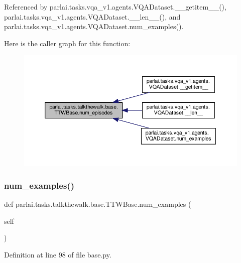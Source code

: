 Referenced by parlai.\+tasks.\+vqa\+\_\+v1.\+agents.\+V\+Q\+A\+Dataset.\+\_\+\+\_\+getitem\+\_\+\+\_\+(), parlai.\+tasks.\+vqa\+\_\+v1.\+agents.\+V\+Q\+A\+Dataset.\+\_\+\+\_\+len\+\_\+\+\_\+(), and parlai.\+tasks.\+vqa\+\_\+v1.\+agents.\+V\+Q\+A\+Dataset.\+num\+\_\+examples().

Here is the caller graph for this function\+:
\nopagebreak
\begin{figure}[H]
\begin{center}
\leavevmode
\includegraphics[width=350pt]{classparlai_1_1tasks_1_1talkthewalk_1_1base_1_1TTWBase_ab4890c4569ff31724718ed8c684e1a76_icgraph}
\end{center}
\end{figure}
\mbox{\label{classparlai_1_1tasks_1_1talkthewalk_1_1base_1_1TTWBase_a691d7f4a22c6ea032489ea70fe5d6b35}} 
\subsubsection{\texorpdfstring{num\+\_\+examples()}{num\_examples()}}
{\footnotesize\ttfamily def parlai.\+tasks.\+talkthewalk.\+base.\+T\+T\+W\+Base.\+num\+\_\+examples (\begin{DoxyParamCaption}\item[{}]{self }\end{DoxyParamCaption})}



Definition at line 98 of file base.\+py.



